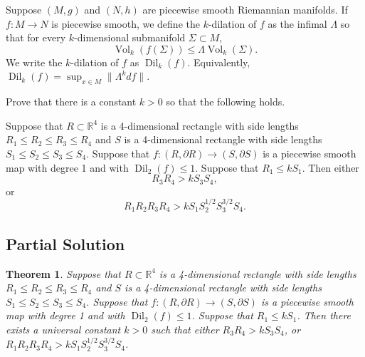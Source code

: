 \documentclass[12pt]{article}
\DeclareMathOperator{\Vol}{Vol}
\DeclareMathOperator{\Dil}{Dil}
\newcommand{\RR}{\mathbb{R}}
\newtheorem{theorem}{Theorem}
\begin{document}
Suppose $(M, g)$ and $(N,h)$ are piecewise smooth Riemannian manifolds. If $f: M \rightarrow N$ is piecewise smooth, we define the $k$-dilation of $f$ as the infimal $\Lambda$ so that for every $k$-dimensional submanifold $\Sigma \subset M$, 
\[ \Vol_k( f(\Sigma) ) \le \Lambda \Vol_k (\Sigma). \]
We write the $k$-dilation of $f$ as $\Dil_k(f)$. Equivalently, $\Dil_k(f) = \sup_{x \in M} \| \Lambda^k df \|$.

Prove that there is a constant $k > 0$ so that the following holds.

Suppose that $R \subset \RR^4$ is a 4-dimensional rectangle with side lengths $R_1 \le R_2 \le R_3 \le R_4$ and $S$ is a 4-dimensional rectangle with side lengths $S_1 \le S_2 \le S_3 \le S_4$. Suppose that $f: (R, \partial R) \rightarrow (S, \partial S)$ is a piecewise smooth map with degree 1 and with $\Dil_2(f) \le 1$. Suppose that $R_1 \le k S_1$. Then either
\[ R_3 R_4 > k S_3 S_4, \]
or 
\[ R_1 R_2 R_3 R_4 > k S_1 S_2^{1/2} S_3^{3/2} S_4. \]

\subsection*{Partial Solution}

\begin{theorem}
Suppose that $R \subset \mathbb{R}^4$ is a 4-dimensional rectangle with side lengths $R_1 \le R_2 \le R_3 \le R_4$ and $S$ is a 4-dimensional rectangle with side lengths $S_1 \le S_2 \le S_3 \le S_4$. Suppose that $f: (R, \partial R) \rightarrow (S, \partial S)$ is a piecewise smooth map with degree 1 and with $\Dil_2(f) \le 1$. Suppose that $R_1 \le k S_1$. Then there exists a universal constant $k > 0$ such that either $R_3 R_4 > k S_3 S_4$, or $R_1 R_2 R_3 R_4 > k S_1 S_2^{1/2} S_3^{3/2} S_4$.
\end{theorem}
\end{document}
